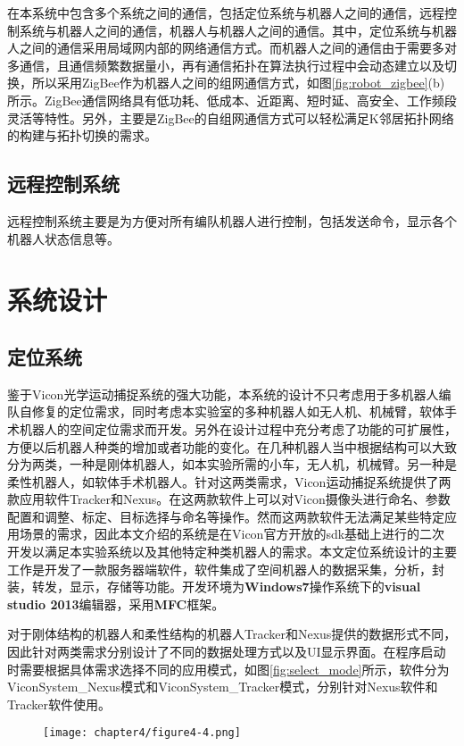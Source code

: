 在本系统中包含多个系统之间的通信，包括定位系统与机器人之间的通信，远程控制系统与机器人之间的通信，机器人与机器人之间的通信。其中，定位系统与机器人之间的通信采用局域网内部的网络通信方式。而机器人之间的通信由于需要多对多通信，且通信频繁数据量小，再有通信拓扑在算法执行过程中会动态建立以及切换，所以采用ZigBee作为机器人之间的组网通信方式，如图\ref{fig:robot_zigbee}(b)所示。ZigBee通信网络具有低功耗、低成本、近距离、短时延、高安全、工作频段灵活等特性。另外，主要是ZigBee的自组网通信方式可以轻松满足K邻居拓扑网络的构建与拓扑切换的需求。

\subsection{远程控制系统}
远程控制系统主要是为方便对所有编队机器人进行控制，包括发送命令，显示各个机器人状态信息等。

\section{系统设计}

\subsection{定位系统}
鉴于Vicon光学运动捕捉系统的强大功能，本系统的设计不只考虑用于多机器人编队自修复的定位需求，同时考虑本实验室的多种机器人如无人机、机械臂，软体手术机器人的空间定位需求而开发。另外在设计过程中充分考虑了功能的可扩展性，方便以后机器人种类的增加或者功能的变化。在几种机器人当中根据结构可以大致分为两类，一种是刚体机器人，如本实验所需的小车，无人机，机械臂。另一种是柔性机器人，如软体手术机器人。针对这两类需求，Vicon运动捕捉系统提供了两款应用软件Tracker和Nexus。在这两款软件上可以对Vicon摄像头进行命名、参数配置和调整、标定、目标选择与命名等操作。然而这两款软件无法满足某些特定应用场景的需求，因此本文介绍的系统是在Vicon官方开放的sdk基础上进行的二次开发以满足本实验系统以及其他特定种类机器人的需求。本文定位系统设计的主要工作是开发了一款服务器端软件，软件集成了空间机器人的数据采集，分析，封装，转发，显示，存储等功能。开发环境为\textbf{Windows7}操作系统下的\textbf{visual studio 2013}编辑器，采用\textbf{MFC}框架。

对于刚体结构的机器人和柔性结构的机器人Tracker和Nexus提供的数据形式不同，因此针对两类需求分别设计了不同的数据处理方式以及UI显示界面。在程序启动时需要根据具体需求选择不同的应用模式，如图\ref{fig:select_mode}所示，软件分为ViconSystem\_Nexus模式和ViconSystem\_Tracker模式，分别针对Nexus软件和Tracker软件使用。
\begin{figure}[!htbp]
	\centering
	\texttt{[image: chapter4/figure4-4.png]}
\end{figure}

